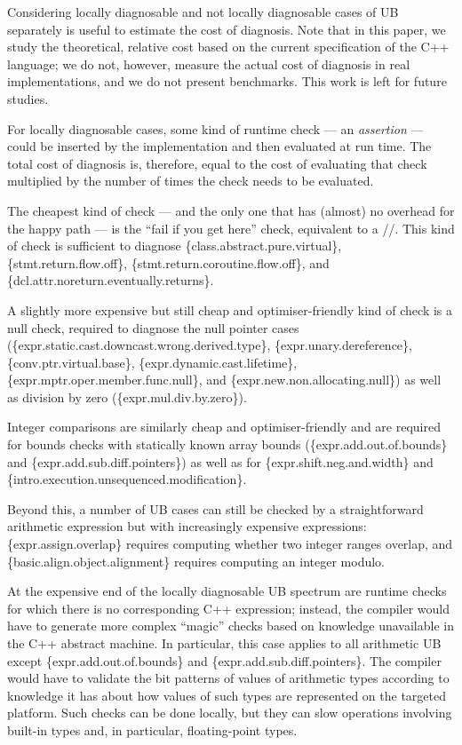 Considering locally diagnosable and not locally diagnosable cases of UB separately is useful to estimate the cost of diagnosis. Note that in this paper, we study the theoretical, relative cost based on the current specification of the C++ language; we do not, however, measure the actual cost of diagnosis in real implementations, and we do not present benchmarks. This work is left for future studies. %

For locally diagnosable cases, some kind of runtime check --- an \emph{assertion} --- could be inserted by the implementation and then evaluated at run time. The total cost of diagnosis is, therefore, equal to the cost of evaluating that check multiplied by the number of times the check needs to be evaluated.

The cheapest kind of check --- and the only one that has (almost) no overhead for the happy path --- is the ``fail if you get here'' check, equivalent to a //. This kind of check is sufficient to diagnose \{class.abstract.pure.virtual\}, \{stmt.return.flow.off\}, \{stmt.return.coroutine.flow.off\}, and \{dcl.attr.noreturn.eventually.returns\}.

A slightly more expensive but still cheap and optimiser-friendly kind of check is a null check, required to diagnose the null pointer cases  
(\{expr.static.cast.downcast.wrong.derived.type\},
\{expr.unary.deref\-erence\},
\{conv.ptr.virtual.base\},
\{expr.dynamic.cast.lifetime\}, 
\{expr.mptr.oper.member.\linebreak[3]func.null\}, and
\{expr.new.non.allocating.null\})
as well as division by zero (\{expr.mul.div.by.zero\}).

Integer comparisons are similarly cheap and optimiser-friendly and are   required for bounds checks with statically known array bounds
(\{expr.add.out.of.bounds\} and
\{expr.add.sub.diff.pointers\})
as well as for \{expr.shift.neg.and.width\} 
and \{intro.execution.unsequenced.modification\}.

Beyond this, a number of UB cases can still be checked by a straightforward arithmetic expression but with increasingly expensive expressions: \{expr.assign.overlap\} requires computing whether two integer ranges overlap, and  \{basic.align.object.alignment\} requires computing an integer modulo. 

At the expensive end of the locally diagnosable UB spectrum are runtime checks for which there is no corresponding C++ expression; instead, the compiler would have to generate more complex ``magic'' checks based on knowledge unavailable in the C++ abstract machine. In particular, this case applies to all arithmetic UB except \{expr.add.out.of.bounds\} and
\{expr.add.sub.diff.pointers\}. The compiler would have to validate the bit patterns of values of arithmetic types according to knowledge it has about how values of such types are represented on the targeted platform. Such checks can be done locally, but they can slow operations involving built-in types and, in particular, floating-point types.


